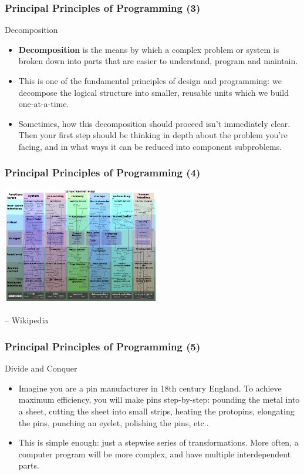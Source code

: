 \documentclass[10pt]{beamer}
\begin{document}
\begin{frame}
  \frametitle{Principal Principles of Programming (3)}
  \begin{block}{Decomposition}
    \begin{itemize}
      \item \textbf{Decomposition} is the means by which a complex problem or system is broken down into parts that are easier to understand, program and maintain.
      \item This is one of the fundamental principles of design and programming: we decompose the logical structure into smaller, reusable units which we build one-at-a-time.
      \item Sometimes, how this decomposition should proceed isn't immediately clear.
        Then your first step should be thinking in depth about the problem you're facing, and in what ways it can be reduced into component subproblems.
    \end{itemize}
  \end{block}
\end{frame}

\begin{frame}
  \frametitle{Principal Principles of Programming (4)}
  \centering
  \includegraphics[width=260px]{LinuxKernelMap.png}
  \begin{flushright} 
    \footnotesize -- Wikipedia
  \end{flushright}
\end{frame}

\begin{frame}
  \frametitle{Principal Principles of Programming (5)}
  \begin{block}{Divide and Conquer}
    \begin{itemize}
      \item Imagine you are a pin manufacturer in 18th century England.
        To achieve maximum efficiency, you will make pins step-by-step: pounding the metal into a sheet, cutting the sheet into small strips, heating the protopins, elongating the pins, punching an eyelet, polishing the pins, etc..
      \item This is simple enough: just a stepwise series of transformations.
        More often, a computer program will be more complex, and have multiple interdependent parts.
    \end{itemize}
  \end{block}
\end{frame}
\end{document}
